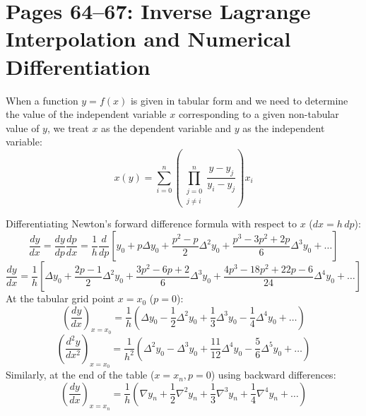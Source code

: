 \section{Pages 64--67: Inverse Lagrange Interpolation and Numerical Differentiation}
\label{sec:inverse_interpolation_differentiation}

\begin{theorembox}
When a function $y = f(x)$ is given in tabular form and we need to determine the value of the independent variable $x$ corresponding to a given non-tabular value of $y$, we treat $x$ as the dependent variable and $y$ as the independent variable:
\begin{equation}
    \boxed{x(y) = \sum_{i=0}^n \left( \prod_{\substack{j=0 \\ j \ne i}}^n \frac{y - y_j}{y_i - y_j} \right) x_i}
\end{equation}
\end{theorembox}

\begin{theorembox}
Differentiating Newton's forward difference formula with respect to $x$ ($dx = h\,dp$):
\begin{equation}
    \frac{dy}{dx} = \frac{dy}{dp} \frac{dp}{dx} = \frac{1}{h} \frac{d}{dp}\left[ y_0 + p\Delta y_0 + \frac{p^2-p}{2}\Delta^2 y_0 + \frac{p^3-3p^2+2p}{6}\Delta^3 y_0 + \dots \right]
\end{equation}
\begin{equation}
    \boxed{\frac{dy}{dx} = \frac{1}{h}\left[ \Delta y_0 + \frac{2p - 1}{2}\Delta^2 y_0 + \frac{3p^2 - 6p + 2}{6}\Delta^3 y_0 + \frac{4p^3 - 18p^2 + 22p - 6}{24}\Delta^4 y_0 + \dots \right]}
\end{equation}
At the tabular grid point $x = x_0$ ($p = 0$):
\begin{equation}
    \boxed{\left(\frac{dy}{dx}\right)_{x=x_0} = \frac{1}{h}\left( \Delta y_0 - \frac{1}{2}\Delta^2 y_0 + \frac{1}{3}\Delta^3 y_0 - \frac{1}{4}\Delta^4 y_0 + \dots \right)}
\end{equation}
\begin{equation}
    \boxed{\left(\frac{d^2y}{dx^2}\right)_{x=x_0} = \frac{1}{h^2}\left( \Delta^2 y_0 - \Delta^3 y_0 + \frac{11}{12}\Delta^4 y_0 - \frac{5}{6}\Delta^5 y_0 + \dots \right)}
\end{equation}
Similarly, at the end of the table ($x = x_n, p = 0$) using backward differences:
\begin{equation}
    \boxed{\left(\frac{dy}{dx}\right)_{x=x_n} = \frac{1}{h}\left( \nabla y_n + \frac{1}{2}\nabla^2 y_n + \frac{1}{3}\nabla^3 y_n + \frac{1}{4}\nabla^4 y_n + \dots \right)}
\end{equation}
\end{theorembox}

